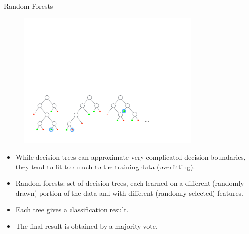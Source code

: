 \documentclass[xcolor=pdftex,dvipsnames,table]{beamer}
\begin{document}

\begin{frame}{Random Forests}
\begin{figure}[htb]
\includegraphics[width=0.8\textwidth]{../graphics/Forest.pdf}
\end{figure}
\begin{itemize}
	\item While decision trees can approximate very complicated decision boundaries, they tend to fit too much to the training data (overfitting).
	\item Random forests: set of decision trees, each learned on a different (randomly drawn) portion of the data and with different (randomly selected) features.
	\item Each tree gives a classification result.
	\item The final result is obtained by a majority vote.
\end{itemize}
\end{frame}
\end{document}
